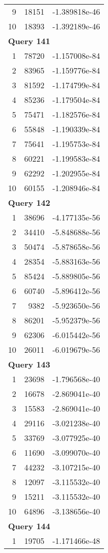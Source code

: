 \begin{longtable}[{p}]{@{}rrp{}@{}}
9 & 18151 & -1.389818e-46 \\
10 & 18393 & -1.392189e-46 \\
\midrule
\multicolumn{3}{l}{\bfseries Query 141} \\
1 & 78720 & -1.157008e-84 \\
2 & 83965 & -1.159776e-84 \\
3 & 81592 & -1.174799e-84 \\
4 & 85236 & -1.179504e-84 \\
5 & 75471 & -1.182576e-84 \\
6 & 55848 & -1.190339e-84 \\
7 & 75641 & -1.195753e-84 \\
8 & 60221 & -1.199583e-84 \\
9 & 62292 & -1.202955e-84 \\
10 & 60155 & -1.208946e-84 \\
\midrule
\multicolumn{3}{l}{\bfseries Query 142} \\
1 & 38696 & -4.177135e-56 \\
2 & 34410 & -5.848688e-56 \\
3 & 50474 & -5.878658e-56 \\
4 & 28354 & -5.883163e-56 \\
5 & 85424 & -5.889805e-56 \\
6 & 60740 & -5.896412e-56 \\
7 & 9382 & -5.923650e-56 \\
8 & 86201 & -5.952379e-56 \\
9 & 62306 & -6.015442e-56 \\
10 & 26011 & -6.019679e-56 \\
\midrule
\multicolumn{3}{l}{\bfseries Query 143} \\
1 & 23698 & -1.796568e-40 \\
2 & 16678 & -2.869041e-40 \\
3 & 15583 & -2.869041e-40 \\
4 & 29116 & -3.021238e-40 \\
5 & 33769 & -3.077925e-40 \\
6 & 11690 & -3.099070e-40 \\
7 & 44232 & -3.107215e-40 \\
8 & 12097 & -3.115532e-40 \\
9 & 15211 & -3.115532e-40 \\
10 & 64896 & -3.138656e-40 \\
\midrule
\multicolumn{3}{l}{\bfseries Query 144} \\
1 & 19705 & -1.171466e-48 \\

\end{longtable}
